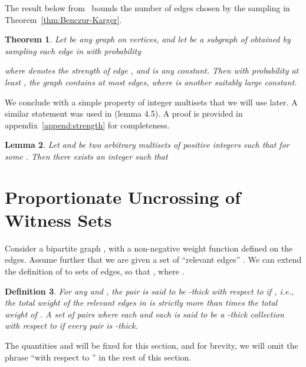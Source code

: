 \documentclass[11pt]{article}
\newtheorem{theorem}{Theorem}[section]
\newtheorem{lemma}[theorem]{Lemma}
\newtheorem{definition}[theorem]{Definition}
\begin{document}
The result below from~\cite{benczurkarger96} bounds the number of edges chosen
by the sampling in Theorem~\ref{thm:Benczur-Karger}.
\begin{theorem}
\label{thm:Benczur-Karger2}
Let  be any graph on  vertices, and let  be a subgraph of  obtained by
sampling each edge  in  with probability

where  denotes the strength of edge , and  is any constant. Then
with probability at least , the graph  contains at most
 edges, where  is another suitably large constant.
\end{theorem}

We conclude with a simple property of integer multisets that we will use
later. A similar statement was used in \cite{karger-levine} (lemma 4.5). A proof is provided in appendix~\ref{append:strength} for completeness.
\begin{lemma}
\label{lem:strength}
Let  and  be two arbitrary multisets of positive integers such that  for some .
Then there exists an integer  such that

\end{lemma}

\section{Proportionate Uncrossing of Witness Sets}
\label{sec:proportion}
Consider a bipartite graph , with a non-negative weight function
 defined on the edges. Assume further that we are given a set of ``relevant
edges'' . We can extend the definition of  to sets of
edges, so that , where .

\begin{definition}
\label{def:gamma_thick}
For any  and , the pair  is said to be
-thick with respect to  if , {\em i.e.}, the total weight of the relevant edges in  is {\em
  strictly} more than  times the total weight of . A set of
pairs  where each  and each  is said to be a -thick
collection with respect to  if every pair  is
-thick.
\end{definition}

The quantities  and  will be fixed for this section, and
for brevity, we will omit the phrase ``with respect to '' in the
rest of this section.
\end{document}
